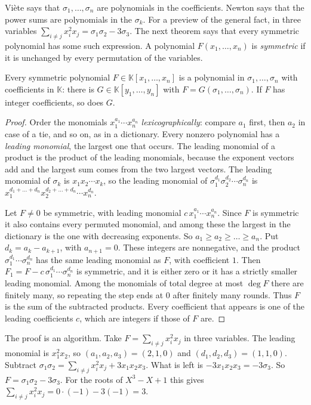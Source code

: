 Vi\`ete says that $\sigma_1,\dots,\sigma_n$ are polynomials in the coefficients. Newton says that the power sums are polynomials in the $\sigma_k$. For a preview of the general fact, in three variables $\sum_{i\ne j}x_i^2x_j=\sigma_1\sigma_2-3\sigma_3$. The next theorem says that every symmetric polynomial has some such expression. A polynomial $F(x_1,\dots,x_n)$ is \emph{symmetric} if it is unchanged by every permutation of the variables.

\begin{theorem}\label{thm:symmetric}
Every symmetric polynomial $F\in\mathbb K[x_1,\dots,x_n]$ is a polynomial in $\sigma_1,\dots,\sigma_n$ with coefficients in $\mathbb K$: there is $G\in\mathbb K[y_1,\dots,y_n]$ with $F=G(\sigma_1,\dots,\sigma_n)$. If $F$ has integer coefficients, so does $G$.
\end{theorem}
\begin{proof}
Order the monomials $x_1^{a_1}\cdots x_n^{a_n}$ \emph{lexicographically}: compare $a_1$ first, then $a_2$ in case of a tie, and so on, as in a dictionary. Every nonzero polynomial has a \emph{leading monomial}, the largest one that occurs. The leading monomial of a product is the product of the leading monomials, because the exponent vectors add and the largest sum comes from the two largest vectors. The leading monomial of $\sigma_k$ is $x_1x_2\cdots x_k$, so the leading monomial of $\sigma_1^{d_1}\sigma_2^{d_2}\cdots\sigma_n^{d_n}$ is $x_1^{d_1+\dots+d_n}x_2^{d_2+\dots+d_n}\cdots x_n^{d_n}$.

Let $F\ne0$ be symmetric, with leading monomial $c\,x_1^{a_1}\cdots x_n^{a_n}$. Since $F$ is symmetric it also contains every permuted monomial, and among these the largest in the dictionary is the one with decreasing exponents. So $a_1\ge a_2\ge\dots\ge a_n$. Put $d_k=a_k-a_{k+1}$, with $a_{n+1}=0$. These integers are nonnegative, and the product $\sigma_1^{d_1}\cdots\sigma_n^{d_n}$ has the same leading monomial as $F$, with coefficient $1$. Then $F_1=F-c\,\sigma_1^{d_1}\cdots\sigma_n^{d_n}$ is symmetric, and it is either zero or it has a strictly smaller leading monomial. Among the monomials of total degree at most $\deg F$ there are finitely many, so repeating the step ends at $0$ after finitely many rounds. Thus $F$ is the sum of the subtracted products. Every coefficient that appears is one of the leading coefficients $c$, which are integers if those of $F$ are.
\end{proof}

\begin{examplex}
The proof is an algorithm. Take $F=\sum_{i\ne j}x_i^2x_j$ in three variables. The leading monomial is $x_1^2x_2$, so $(a_1,a_2,a_3)=(2,1,0)$ and $(d_1,d_2,d_3)=(1,1,0)$. Subtract $\sigma_1\sigma_2=\sum_{i\ne j}x_i^2x_j+3x_1x_2x_3$. What is left is $-3x_1x_2x_3=-3\sigma_3$. So $F=\sigma_1\sigma_2-3\sigma_3$. For the roots of $X^3-X+1$ this gives $\sum_{i\ne j}x_i^2x_j=0\cdot(-1)-3(-1)=3$.
\end{examplex}

